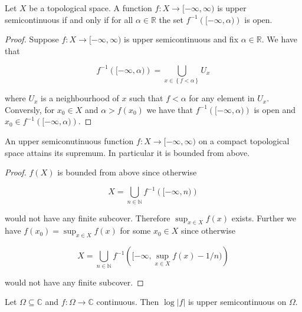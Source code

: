 \begin{lemma*}
	Let $X$ be a topological space. A function $f: X \to [-\infty,\infty)$ is upper semicontinuous if and only if for all $\alpha \in \mathbb{R}$ the set $f^{-1}\left( [-\infty,\alpha )\right)$ is open.
\end{lemma*}

\begin{proof}
	Suppose $f: X \to [-\infty,\infty)$ is upper semicontinuous and fix $\alpha \in \mathbb{R}$. We have that 

		\begin{equation*}
			f^{-1}\left( [-\infty,\alpha )\right) = \bigcup_{x \in \left\{ f < \alpha \right\}} U_x
		\end{equation*}

		\noindent where $U_x$ is a neighbourhood of $x$ such that $f < \alpha$ for any element in $U_x$. Conversly, for $x_0 \in X$ and $\alpha > f(x_0)$ we have that $f^{-1}\left( [-\infty,\alpha )\right)$ is open and $x_0 \in f^{-1}\left( [-\infty,\alpha )\right)$.
\end{proof}

\begin{lemma*}
	An upper semiconutinuous function $f: X \to [-\infty,\infty)$ on a compact topological space attains its supremum. In particular it is bounded from above.
		\label{lem:semicom}
\end{lemma*}

\begin{proof}
	 $f(X)$ is bounded from above since otherwise

	\begin{equation*}
		X = \bigcup_{n \in \mathbb{N}} f^{-1}\left( [-\infty,n)\right)
	\end{equation*}

	\noindent would not have any finite subcover. Therefore $\sup_{x \in X}f(x)$ exists. Further we have $f(x_0) = \sup_{x \in X}f(x)$ for some $x_0 \in X$ since otherwise

	\begin{equation*}
		X = \bigcup_{n \in \mathbb{N}} \textstyle f^{-1}\left( [-\infty,\sup_{x \in X}f(x) - 1/n)\right)
	\end{equation*}

	\noindent would not have any finite subcover.	
\end{proof}

\begin{lemma}
	Let $\Omega \subseteq \mathbb{C}$ and $f: \Omega \to \mathbb{C}$ continuous. Then $\log\left| f\right|$ is upper semicontinuous on $\Omega$.
	\label{lem:uppersemcont}
\end{lemma}

